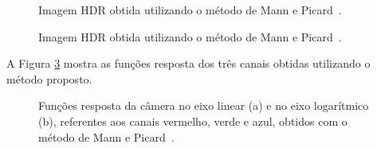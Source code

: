 \begin{figure}[H]
  \centering
  \quad %
  \caption{Imagem HDR obtida utilizando o método de Mann e Picard~\protect\cite{mann}.}
  \label{figMann2}
\end{figure}

\begin{figure}[H]
  \centering
  \quad %
  \caption{Imagem HDR obtida utilizando o método de Mann e Picard~\protect\cite{mann}.}
  \label{figMann3}
\end{figure}

A Figura \ref{figMannFR} mostra as funções resposta dos três canais obtidas utilizando o método proposto.

\begin{figure}[H]
  \centering
  \quad %
  \caption{Funções resposta da câmera no eixo linear (a) e no eixo logarítmico (b), referentes aos canais vermelho, verde e azul, obtidos com o método de Mann e Picard~\protect\cite{mann}.}
  \label{figMannFR}
\end{figure}